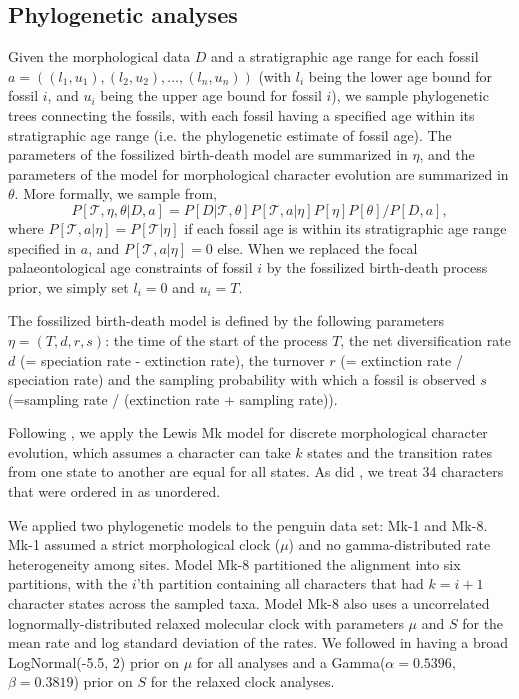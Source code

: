 \documentclass[11pt]{article}
\newcommand{\Mstrict}{{Mk-1}}
\newcommand{\Mrelaxed}{{Mk-8}}
\begin{document}
\subsection*{Phylogenetic analyses}

Given the morphological data $D$ and a stratigraphic age range for each fossil $a = ((l_1,u_1),(l_2, u_2),\ldots,(l_n,u_n))$ (with $l_i$ being the lower age bound for fossil $i$, and $u_i$ being the upper age bound for fossil $i$), we sample phylogenetic trees connecting the fossils, with each fossil having a specified age within its stratigraphic age range (i.e. the phylogenetic estimate of fossil age). The parameters of the fossilized birth-death model are summarized in $\eta$, and the parameters  of the model for morphological character evolution are summarized in $\theta$. More formally, we sample from,
$$P[\mathcal{T},\eta, \theta | D, a] = P[D|\mathcal{T},\theta] P[\mathcal{T},a|\eta] P[\eta] P[\theta]/P[D,a],$$
where $ P[\mathcal{T},a|\eta] =  P[\mathcal{T}|\eta] $ if each fossil age is within its stratigraphic age range specified in $a$, and $ P[\mathcal{T},a|\eta] =0$ else.
When we replaced the focal  palaeontological age constraints of fossil $i$  by 
the fossilized birth-death process prior, we simply set $l_i=0$ and $u_i=T$.

The fossilized birth-death model is defined by the following parameters $\eta=(T,d,r,s)$:  the time of the start of the process $T$, the net diversification rate $d$ (= speciation rate - extinction rate), the turnover $r$ (= extinction rate / speciation rate) and the sampling probability with which a fossil is observed $s$ (=sampling rate / (extinction rate + sampling rate)).
  
Following \cite{gavryushkina2015bayesian}, we apply the Lewis Mk model 
\cite{Lewis2001} for discrete morphological character evolution, which assumes a character can take $k$ states and the transition rates from one state to another are equal for all states. As did \cite{gavryushkina2015bayesian}, we treat 34 characters that were ordered in \cite{ksepka2012} as unordered. 

We applied two phylogenetic models to the penguin data set: \Mstrict{} and \Mrelaxed{}. \Mstrict{} assumed a strict morphological clock ($\mu$) and no gamma-distributed rate heterogeneity among sites. Model \Mrelaxed{} partitioned the alignment into six partitions, with the $i$'th partition containing all characters that had $k=i+1$ character states across the sampled taxa. Model \Mrelaxed{} also uses a uncorrelated lognormally-distributed relaxed molecular clock \cite{Drummond2006} with parameters $\mu$ and $S$ for the mean rate and log standard deviation of the rates. We followed \cite{gavryushkina2015bayesian} in having a broad LogNormal(-5.5, 2) prior on $\mu$ for all analyses and a Gamma($\alpha=0.5396$, $\beta=0.3819$) prior on $S$ for the relaxed clock analyses.
\end{document}
